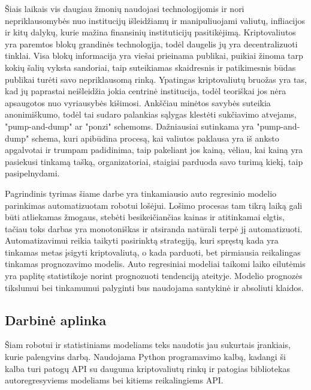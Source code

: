 \documentclass{VUMIFInfKursinis}
\begin{document}
Šiais laikais vis daugiau žmonių naudojasi technologijomis ir nori nepriklausomybės nuo institucijų išleidžiamų ir manipuliuojami valiutų, infliacijos ir kitų dalykų, 
kurie mažina finansinių instituticijų pasitikėjimą. Kriptovaliutos yra paremtos blokų grandinės technologija, todėl daugelis jų yra decentralizuoti tinklai. 
Visa blokų informacija yra viešai prieinama publikai, puikiai žinoma tarp kokių šalių vyksta sandoriai, taip suteikiamas skaidresnis ir patikimesnis būdas publikai
turėti savo nepriklausomą rinką. Ypatingas kriptovaliutų bruožas yra tas, kad jų paprastai neišleidžia jokia centrinė institucija, todėl teoriškai jos nėra 
apsaugotos nuo vyriausybės kišimosi. Ankščiau minėtos savybės suteikia anonimiškumo, todėl tai sudaro palankias sąlygas klestėti sukčiavimo atvejams, 
"pump-and-dump" ar "ponzi" schemoms. Dažniausiai sutinkama yra "pump-and-dump" schema, kuri apibūdina procesą, kai valiutos paklausa yra iš anksto
apgalvotai ir trumpam padidinima, taip pakeliant jos kainą, vėliau, kai kainą yra pasiekusi tinkamą tašką, organizatoriai, staigiai parduoda savo
turimą kiekį, taip pasipelnydami\cite{xu2019anatomy}.

Pagrindinis tyrimas šiame darbe yra tinkamiausio auto regresinio modelio parinkimas automatizuotam robotui lošėjui. Lošimo procesas tam tikrą laiką gali būti atliekamas žmogaus, 
stebėti besikeičiančias kainas ir atitinkamai elgtis, tačiau toks darbas yra monotoniškas ir atsiranda natūrali terpė jį automatizuoti. Automatizavimui
reikia taikyti pasirinktą strategiją, kuri spręstų kada yra tinkamas metas įsigyti kriptovaliutą, o kada parduoti, bet pirmiausia reikalingas tinkamas prognozavimo modelis.
Auto regresiniai modeliai taikomi laiko eilutėmis yra paplitę statistikoje norint prognozuoti tendenciją ateityje. Modelio prognozės tikslumui bei tinkamumui palyginti 
bus naudojama santykinė ir absoliuti klaidos.

\subsection{Darbinė aplinka}
Šiam robotui ir statistiniams modeliams teks naudotis jau sukurtais įrankiais, kurie palengvins darbą. Naudojama Python programavimo kalbą, 
kadangi ši kalba turi patogų API su dauguma kriptovaliutų rinkų ir patogias bibliotekas autoregresyviems modeliams bei kitiems reikalingiems API.
\end{document}
